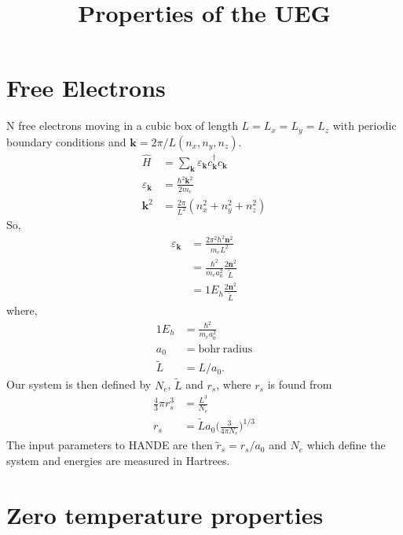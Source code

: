 \documentclass[11pt,twosided]{article}
\title{Properties of the UEG}
\begin{document}
\maketitle
\section{Free Electrons}
N free electrons moving in a cubic box of length $L = L_x = L_y = L_z$ with periodic boundary conditions and $\mathbf{k} = 2\pi/L(n_x,n_y,n_z)$.
\begin{align}
    \hat{H} &= \sum_{\mathbf{k}} \varepsilon_{\mathbf{k}} c_{\mathbf{k}}^{\dagger}c_{\mathbf{k}}\\
    \varepsilon_{\mathbf{k}} &= \frac{\hbar^2 \mathbf{k}^2}{2 m_e}\label{free_elec}\\
    \mathbf{k}^2 &= \frac{2 \pi }{L^2} (n_x^2 + n_y^2 + n_z^2)
\end{align}
So,
\begin{align}
    \varepsilon_{\mathbf{k}} &= \frac{2 \pi^2 \hbar^2 \mathbf{n}^2}{ m_e L^2}\\
                             & = \frac{\hbar^2}{m_e a_0^2} \frac{2 \mathbf{n}^2}{\tilde{L}}\\
                             & = 1 E_h  \frac{2 \mathbf{n}^2}{\tilde{L}}
\end{align}
where,
\begin{align}
    1 E_h &= \frac{\hbar^2}{m_e a_0^2}\\
    a_0 & = \mathrm{bohr \ radius}\\
    \tilde{L} &= L/a_0.
\end{align}
Our system is then defined by $N_e$, $\tilde{L}$ and $r_s$, where $r_s$ is found from
\begin{align}
    \frac{4}{3}\pi r_s^3 &= \frac{L^3}{N_e}\\
    r_s &= \tilde{L} a_0 \Big(\frac{3}{4\pi N_e}\Big)^{1/3}
\end{align}
The input parameters to HANDE are then $\tilde{r}_s = r_s/a_0$ and $N_e$ which define the system and energies are measured in Hartrees.
\section{Zero temperature properties}
\end{document}
